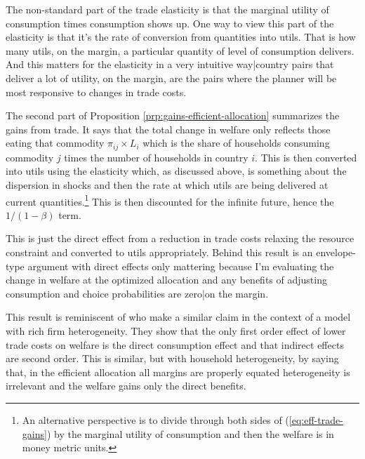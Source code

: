 \documentclass[12pt,pdftex]{article}
\begin{document}
\begin{onehalfspacing}
The non-standard part of the trade elasticity is that the marginal utility of consumption times consumption shows up. One way to view this part of the elasticity is that it's the rate of conversion from quantities into utils. That is how many utils, on the margin, a particular quantity of level of consumption delivers. And this matters for the elasticity in a very intuitive way|country pairs that deliver a lot of utility, on the margin, are the pairs where the planner will be most responsive to changes in trade costs.

The second part of Proposition \ref{prp:gains-efficient-allocation} summarizes the gains from trade. It says that the total change in welfare only reflects those eating that commodity $\pi_{ij} \times L_i$ which is the share of households consuming commodity $j$ times the number of households in country $i$. This is then converted into utils using the elasticity which, as discussed above, is something about the dispersion in shocks and then the rate at which utils are being delivered at current quantities.\footnote{An alternative perspective is to divide through both sides of (\ref{eq:eff-trade-gains}) by the marginal utility of consumption and then the welfare is in money metric units.} This is then discounted for the infinite future, hence the $1/ (1-\beta)$ term.

This is just the direct effect from a reduction in trade costs relaxing the resource constraint and converted to utils appropriately. Behind this result is an envelope-type argument with direct effects only mattering because I'm evaluating the change in welfare at the optimized allocation and any benefits of adjusting consumption and choice probabilities are zero|on the margin.

This result is reminiscent of \citet{AtkesonBurstein2010} who make a similar claim in the context of a model with rich firm heterogeneity. They show that the only first order effect of lower trade costs on welfare is the direct consumption effect and that indirect effects are second order. This is similar, but with household heterogeneity, by saying that, in the efficient allocation all margins are properly equated heterogeneity is irrelevant and the welfare gains only the direct benefits.


\end{onehalfspacing}
\end{document}
